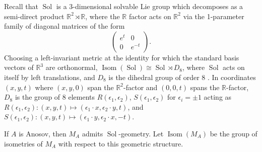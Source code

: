 \documentclass{amsart}
\theoremstyle{plain}
\theoremstyle{definition}
\DeclareMathOperator\Isom{Isom}
\DeclareMathOperator\Sol{Sol}
\newcommand{\bbR}{\mathbb{R}}
\begin{document}
Recall that $\Sol$ is a 3-dimensional solvable Lie group which decomposes as a semi-direct product $\bbR^2\rtimes \bbR$, where the $\bbR$ factor acts on $\bbR^2$ via the 1-parameter family of diagonal matrices of the form 
\[\left(\begin{array}{cc}e^t&0\\0&e^{-t}\end{array}\right).\]
Choosing a left-invariant metric at the identity for which the standard basis vectors of $\bbR^3$ are orthonormal,  $\Isom(\Sol)\cong \Sol \rtimes D_8$, where $\Sol$ acts on itself by left translations, and $D_8$ is the dihedral group of order 8 \cite{Scott83}. In coordinates $(x,y,t)$ where $(x,y,0)$ span the $\bbR^2$-factor and $(0,0,t)$ spans the $\bbR$-factor, $D_8$ is the group of 8 elements $R(\epsilon_1,\epsilon_2)$, $S(\epsilon_1,\epsilon_2)$ for $\epsilon_i=\pm1$ acting as
$R(\epsilon_1,\epsilon_2)\colon (x,y,t)\mapsto(\epsilon_1\cdot x,\epsilon_2\cdot y,t)$, and $S(\epsilon_1,\epsilon_2)\colon (x,y,t)\mapsto(\epsilon_1\cdot y,\epsilon_2\cdot x,-t).
$

If $A$ is Anosov, then $M_A$ admits $\Sol$-geometry. Let $\Isom(M_A)$ be the group of isometries of $M_A$ with respect to this geometric structure. 
\end{document}
